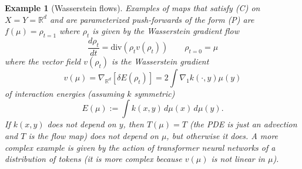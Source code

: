 \documentclass{article}
\newtheorem{example}{Example}
\begin{document}
\begin{example}[Wasserstein flows]\label{ex:flows}
Examples of maps that satisfy (C) on $X=Y=\mathbb{R}^d$ and are parameterized push-forwards of the form (P) are \( f(\mu) = \rho_{t=1} \) where \( \rho_t \) is given by the Wasserstein gradient flow
\[
\frac{d \rho_t}{dt} = \text{div} \left( \rho_t v(\rho_t) \right)
	\qquad
	\rho_{t=0}=\mu
\]
where the vector field $v(\rho_t)$ is the Wasserstein gradient 
$$
	v(\mu) = \nabla_{\mathbb{R}^d} \left[ \delta E(\rho_t) \right] = 2 \int \nabla_1 k(\cdot,y) \mu(y)
$$
of interaction energies (assuming $k$ symmetric)
\[
E(\mu) := \int k(x,y) \, d\mu(x) \, d\mu(y).
\]
If \( k(x,y) \) does not depend on \( y \), then \( T(\mu) = T \) (the PDE is just an advection and $T$ is the flow map) does not depend on \( \mu \), but otherwise it does. A more complex example is given by the action of transformer neural networks of a distribution of tokens (it is more complex because $v(\mu)$ is not linear in $\mu$).
\end{example}
\end{document}

